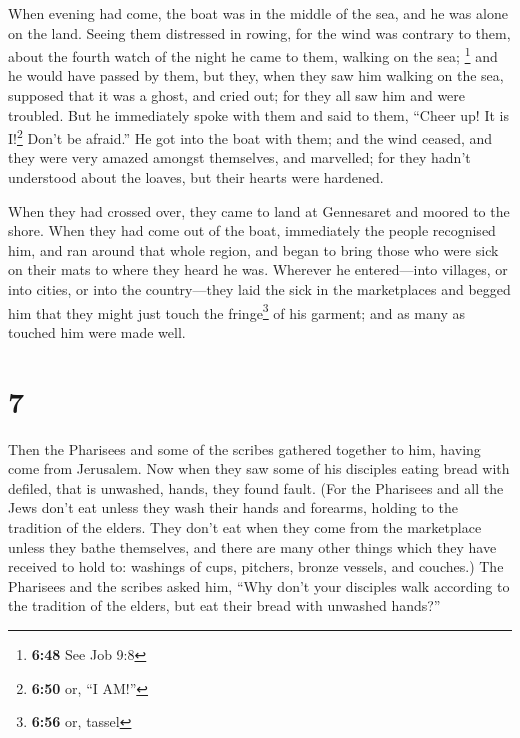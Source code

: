  When evening had come, the boat was in the middle of the
sea, and he was alone on the land.  Seeing them
distressed in rowing, for the wind was contrary to them, about the
fourth watch of the night he came to them, walking on the sea;
\footnote{\textbf{6:48} See Job 9:8} and he would have passed by them,
 but they, when they saw him walking on the sea, supposed
that it was a ghost, and cried out;  for they all saw him
and were troubled. But he immediately spoke with them and said to them,
``Cheer up! It is I!\footnote{\textbf{6:50} or, ``I AM!''} Don't be
afraid.''  He got into the boat with them; and the wind
ceased, and they were very amazed amongst themselves, and marvelled;
 for they hadn't understood about the loaves, but their
hearts were hardened.

 When they had crossed over, they came to land at
Gennesaret and moored to the shore.  When they had come
out of the boat, immediately the people recognised him, 
and ran around that whole region, and began to bring those who were sick
on their mats to where they heard he was.  Wherever he
entered---into villages, or into cities, or into the country---they laid
the sick in the marketplaces and begged him that they might just touch
the fringe\footnote{\textbf{6:56} or, tassel} of his garment; and as
many as touched him were made well.

\hypertarget{section-6}{%
\section{7}\label{section-6}}

 Then the Pharisees and some of the scribes gathered
together to him, having come from Jerusalem.  Now when
they saw some of his disciples eating bread with defiled, that is
unwashed, hands, they found fault.  (For the Pharisees and
all the Jews don't eat unless they wash their hands and forearms,
holding to the tradition of the elders.  They don't eat
when they come from the marketplace unless they bathe themselves, and
there are many other things which they have received to hold to:
washings of cups, pitchers, bronze vessels, and couches.) 
The Pharisees and the scribes asked him, ``Why don't your disciples walk
according to the tradition of the elders, but eat their bread with
unwashed hands?''

